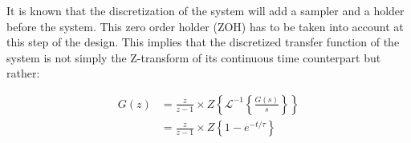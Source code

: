 It is known that the discretization of the system will add a sampler and a holder before the system. This zero order 
holder (ZOH) has to be taken into account at this step of the design. This implies that the discretized transfer 
function of the system is not simply the Z-transform of its continuous time counterpart but rather:

\begin{align}
    G(z) &= \frac{z}{z-1} \times Z \left\{ \mathcal{L}^{-1}\left\{ \frac{G(s)}{s} \right\} \right\}\\
    &= \frac{z}{z-1} \times Z \left\{ 1 - e^{-t/\tau}\right\}
\end{align}

